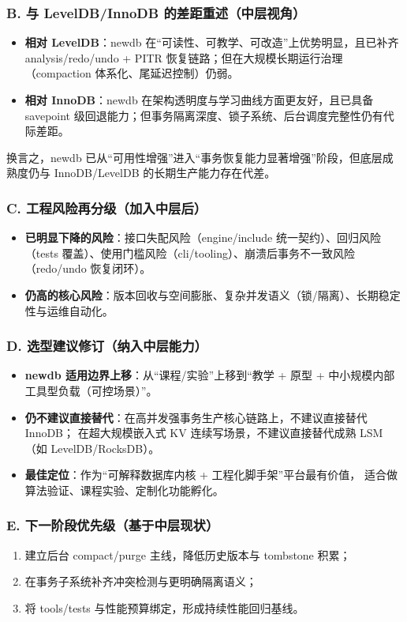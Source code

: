 \subsubsection{B. 与 LevelDB/InnoDB 的差距重述（中层视角）}
\begin{itemize}
  \item \textbf{相对 LevelDB}：newdb 在“可读性、可教学、可改造”上优势明显，且已补齐 analysis/redo/undo + PITR 恢复链路；但在大规模长期运行治理（compaction 体系化、尾延迟控制）仍弱。
  \item \textbf{相对 InnoDB}：newdb 在架构透明度与学习曲线方面更友好，且已具备 savepoint 级回退能力；但事务隔离深度、锁子系统、后台调度完整性仍有代际差距。
\end{itemize}
换言之，newdb 已从“可用性增强”进入“事务恢复能力显著增强”阶段，但底层成熟度仍与 InnoDB/LevelDB 的长期生产能力存在代差。

\subsubsection{C. 工程风险再分级（加入中层后）}
\begin{itemize}
  \item \textbf{已明显下降的风险}：接口失配风险（engine/include 统一契约）、回归风险（tests 覆盖）、使用门槛风险（cli/tooling）、崩溃后事务不一致风险（redo/undo 恢复闭环）。
  \item \textbf{仍高的核心风险}：版本回收与空间膨胀、复杂并发语义（锁/隔离）、长期稳定性与运维自动化。
\end{itemize}

\subsubsection{D. 选型建议修订（纳入中层能力）}
\begin{itemize}
  \item \textbf{newdb 适用边界上移}：从“课程/实验”上移到“教学 + 原型 + 中小规模内部工具型负载（可控场景）”。
  \item \textbf{仍不建议直接替代}：在高并发强事务生产核心链路上，不建议直接替代 InnoDB；
    在超大规模嵌入式 KV 连续写场景，不建议直接替代成熟 LSM（如 LevelDB/RocksDB）。
  \item \textbf{最佳定位}：作为“可解释数据库内核 + 工程化脚手架”平台最有价值，
    适合做算法验证、课程实验、定制化功能孵化。
\end{itemize}

\subsubsection{E. 下一阶段优先级（基于中层现状）}
\begin{enumerate}
  \item 建立后台 compact/purge 主线，降低历史版本与 tombstone 积累；
  \item 在事务子系统补齐冲突检测与更明确隔离语义；
  \item 将 tools/tests 与性能预算绑定，形成持续性能回归基线。
\end{enumerate}

